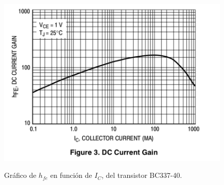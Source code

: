 \begin{figure}[H]
	\centering
	\includegraphics[scale=0.6]{./Imagenes/hfe.png} \\
	\caption{Gr\'afico de $h_{fe}$ en funci\'on de $I_C$, del transistor BC337-40.}
	\label{icbeta}
\end{figure}



